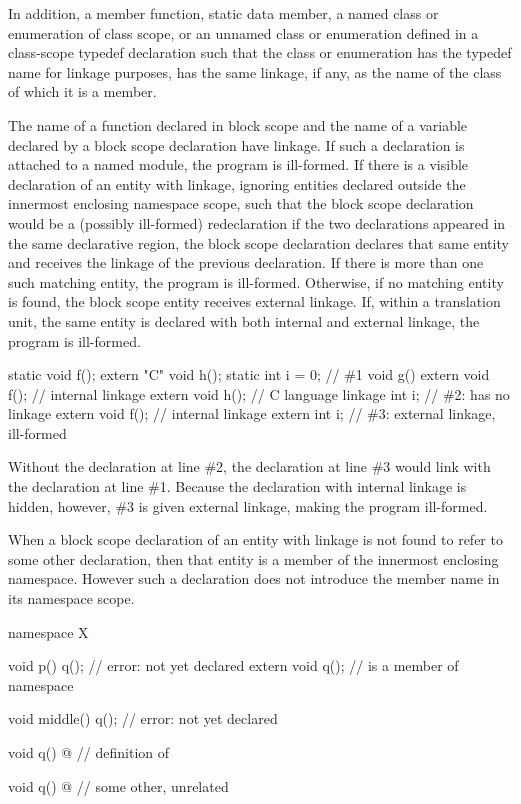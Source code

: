 \pnum
In addition, a member function, static data member, a named class or
enumeration of class scope, or an unnamed class or enumeration defined
in a class-scope typedef declaration such that the class or enumeration
has the typedef name for linkage purposes, has
the same linkage, if any, as the name of the class of which it is a
member.

\pnum
The name of a function declared in block scope and
the name of a variable declared by a block scope  declaration
have linkage.
If such a declaration is attached to a named module,
the program is ill-formed.
If there is a visible declaration
of an entity with linkage, ignoring entities declared
outside the innermost enclosing namespace scope,
such that the block scope declaration would be
a (possibly ill-formed) redeclaration
if the two declarations appeared in the same declarative region,
the block scope declaration declares
that same entity and receives the linkage of the previous declaration. If there is more
than one such matching entity, the program is ill-formed. Otherwise, if no matching
entity is found, the block scope entity receives external linkage.
If, within a translation unit, the same entity is declared with both
internal and external linkage, the program is ill-formed.
\begin{example}
\begin{codeblock}
static void f();
extern "C" void h();
static int i = 0;               // \#1
void g() {
  extern void f();              // internal linkage
  extern void h();              // C language linkage
  int i;                        // \#2:  has no linkage
  {
    extern void f();            // internal linkage
    extern int i;               // \#3: external linkage, ill-formed
  }
}
\end{codeblock}
Without the declaration at line \#2,
the declaration at line \#3 would link with the declaration at line \#1.
Because the declaration with internal linkage is hidden, however,
\#3 is given external linkage, making the program ill-formed.
\end{example}

\pnum
When a block scope declaration of an entity with linkage is not found to
refer to some other declaration, then that entity is a member of the
innermost enclosing namespace. However such a declaration does not
introduce the member name in its namespace scope.
\begin{example}
\begin{codeblock}
namespace X {
  void p() {
    q();                        // error:  not yet declared
    extern void q();            //  is a member of namespace 
  }

  void middle() {
    q();                        // error:  not yet declared
  }

  void q() { @\commentellip@ }        // definition of 
}

void q() { @\commentellip@ }          // some other, unrelated 
\end{codeblock}
\end{example}

